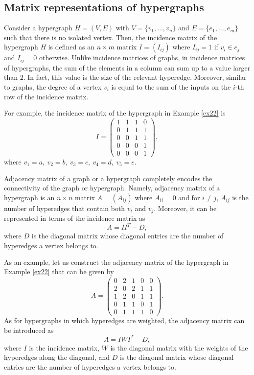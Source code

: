 \documentclass[a4paper,12pt]{article}
\theoremstyle{definition}
\theoremstyle{remark}
\begin{document}
\subsection{Matrix representations of hypergraphs}
Consider a hypergraph $H=(V,E)$ with $V=\{ v_1 , \ldots, v_n \}$ and $E=\{ e_1 , \ldots, e_m \}$ such that there is no isolated vertex. Then, the incidence matrix of the hypergraph $H$ is defined as an $n \times m$ matrix $I=(I_{ij} )$ where $I_{ij} =1$ if $v_i \in e_j$ and $I_{ij} =0$ otherwise. Unlike incidence matrices of graphs, in incidence matrices of hypergraphs, the sum of the elements in a column can sum up to a value larger than 2. In fact, this value is the size of the relevant hyperedge. Moreover, similar to graphs, the degree of a vertex $v_i$ is equal to the sum of the inputs on the $i$-th row of the incidence matrix.  

For example, the incidence matrix of the hypergraph in Example \ref{ex22} is
\begin{equation*}
    I=\begin{pmatrix}
    1 & 1 & 1 & 0 \\
    0 & 1 & 1 & 1 \\
    0  &  0 & 1  & 1 \\
     0  & 0  & 0  & 1 \\
     0  & 0  & 0  & 1
    \end{pmatrix},
\end{equation*}
where $v_1 =a, \ v_2 =b, \ v_3 =c, \ v_4 =d,\ v_5 =e $.

Adjacency matrix of a graph or a hypergraph completely encodes the connectivity of the graph or hypergraph. Namely, adjacency matrix of a hypergraph is an $n \times n$ matrix $A=(A_{ij} )$ where $A_{ii} =0$ and for $i \neq j$, $A_{ij} $ is the number of hyperedges that contain both $v_i$ and $v_j$. Moreover, it can be represented in terms of the incidence matrix as
\begin{equation*}
    A=II^T -D,
\end{equation*}
where $D$ is the diagonal matrix whose diagonal entries are the number of hyperedges a vertex belongs to. 

As an example, let us construct the adjacency matrix of the hypergraph in Example \ref{ex22} that can be given by 
\begin{equation*}
    A=\begin{pmatrix}
    0 & 2 & 1 & 0 & 0 \\
    2 & 0 & 2 & 1 & 1 \\
    1  &  2 & 0  & 1 & 1 \\
     0  & 1  & 1  & 0 & 1 \\
     0  & 1  & 1  & 1 & 0
    \end{pmatrix}.
\end{equation*}
As for hypergraphs in which hyperedges are weighted, the adjacency matrix can be introduced as 
\begin{equation*}
    A=IWI^T -D, 
\end{equation*}
where $I$ is the incidence matrix, $W$ is the diagonal matrix with the weights of the hyperedges along the diagonal, and $D$ is the diagonal matrix whose diagonal entries are the number of hyperedges a vertex belongs to.
\end{document}
